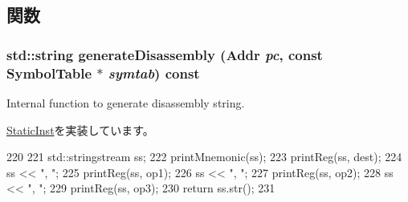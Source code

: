\subsection{関数}
\hypertarget{classRegRegRegRegOp_a95d323a22a5f07e14d6b4c9385a91896}{
\subsubsection[{generateDisassembly}]{\setlength{\rightskip}{0pt plus 5cm}std::string generateDisassembly ({\bf Addr} {\em pc}, \/  const SymbolTable $\ast$ {\em symtab}) const}}
\label{classRegRegRegRegOp_a95d323a22a5f07e14d6b4c9385a91896}
Internal function to generate disassembly string. 

\hyperlink{classStaticInst_ab4a569d2623620c04f8a52bbd91d63b9}{StaticInst}を実装しています。


\begin{DoxyCode}
220 {
221     std::stringstream ss;
222     printMnemonic(ss);
223     printReg(ss, dest);
224     ss << ", ";
225     printReg(ss, op1);
226     ss << ", ";
227     printReg(ss, op2);
228     ss << ", ";
229     printReg(ss, op3);
230     return ss.str();
231 }
\end{DoxyCode}


